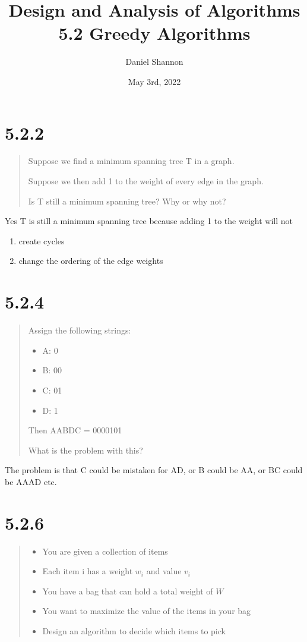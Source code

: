 \documentclass[12pt, letterpaper, twoside]{article}
\title{%
Design and Analysis of Algorithms\\
\large 5.2 Greedy Algorithms
}
\author{Daniel Shannon}
\date{May 3rd, 2022}
\begin{document}
\begin{titlepage}
\maketitle
\end{titlepage}

\section*{5.2.2}

\begin{quote}
    Suppose we find a minimum spanning tree T in a graph.

    Suppose we then add 1 to the weight of every edge in the graph.
    
    Is T still a minimum spanning tree? Why or why not?
\end{quote}

Yes T is still a minimum spanning tree because adding 1 to the weight will not
\begin{enumerate}
    \item create cycles
    \item change the ordering of the edge weights
\end{enumerate}

\section*{5.2.4}

\begin{quote}
    Assign the following strings:
\begin{itemize}
    \item A: 0
    \item B: 00
    \item C: 01
    \item D: 1
\end{itemize}
Then AABDC = 0000101

What is the problem with this?
\end{quote}

The problem is that C could be mistaken for AD, or B could be AA, or BC could be AAAD etc.
\newpage
\section*{5.2.6}
\begin{quote}
    \begin{itemize}
        \item You are given a collection of items
        \item Each item i has a weight $w_i$ and value $v_i$
        \item You have a bag that can hold a total weight of $W$
        \item You want to maximize the value of the items in your bag
        \item Design an algorithm to decide which items to pick
    \end{itemize}
\end{quote}
\end{document}
